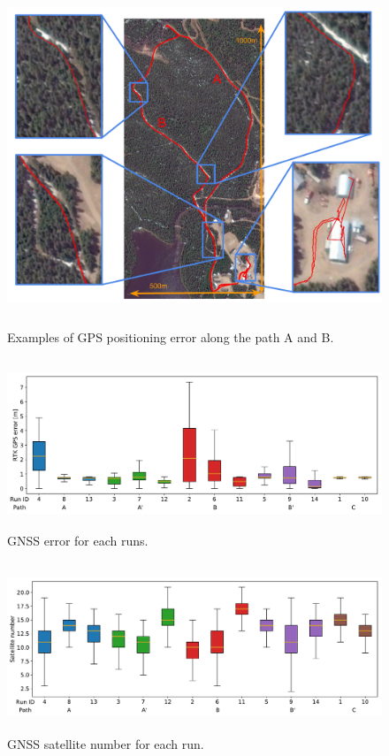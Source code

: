 \begin{figure} [htpb]
	\centering
	\includegraphics[height=4.0in]{./figs/GPS/FR_gps_data_fails2.pdf}
	\caption{Examples of GPS positioning error along the path A and B.}
	\label{fig:gnss_error_path}
\end{figure}

\begin{figure} [htpb]
	\centering
	\includegraphics[height=2.0in]{./figs/GPS/RTK_error.pdf}
	\caption{GNSS error for each runs.}
	\label{fig:gnss_run_error}
\end{figure}

\begin{figure} [htpb]
	\centering
	\includegraphics[height=2.0in]{./figs/GPS/Satellite_number.pdf}
	\caption{GNSS satellite number for each run.}
	\label{fig:gnss_satellite_number}
\end{figure}

